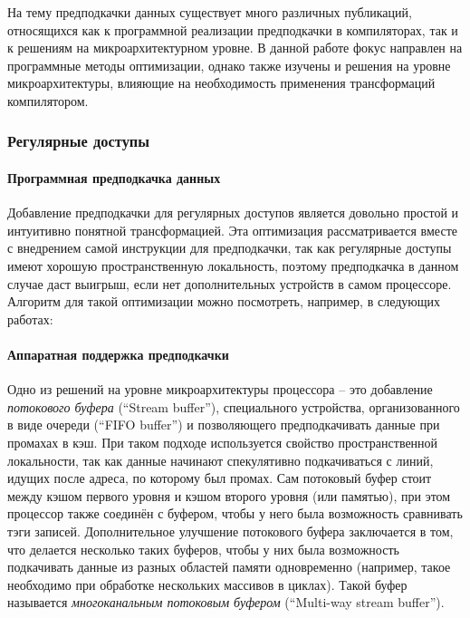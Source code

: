 \documentclass[12pt,a4paper]{article}
\begin{document}
На тему предподкачки данных существует много различных публикаций, относящихся как к программной реализации предподкачки в компиляторах, так и к решениям на микроархитектурном уровне. В данной работе фокус направлен на программные методы оптимизации, однако также изучены и решения на уровне микроархитектуры, влияющие на необходимость применения трансформаций компилятором.

\subsubsection{Регулярные доступы}

\paragraph{Программная предподкачка данных}

Добавление предподкачки для регулярных доступов является довольно простой и интуитивно понятной трансформацией. Эта оптимизация рассматривается вместе с внедрением самой инструкции для предподкачки, так как регулярные доступы имеют хорошую пространственную локальность, поэтому предподкачка в данном случае даст выигрыш, если нет дополнительных устройств в самом процессоре. Алгоритм для такой оптимизации можно посмотреть, например, в следующих работах: %

\paragraph{Аппаратная поддержка предподкачки}

Одно из решений на уровне микроархитектуры процессора -- это добавление \emph{потокового буфера} (``Stream buffer''), специального устройства, организованного в виде очереди (``FIFO buffer'') и позволяющего предподкачивать данные при промахах в кэш. При таком подходе используется свойство пространственной локальности, так как данные начинают спекулятивно подкачиваться с линий, идущих после адреса, по которому был промах. Сам потоковый буфер стоит между кэшом первого уровня и кэшом второго уровня (или памятью), при этом процессор также соединён с буфером, чтобы у него была возможность сравнивать тэги записей. Дополнительное улучшение потокового буфера заключается в том, что делается несколько таких буферов, чтобы у них была возможность подкачивать данные из разных областей памяти одновременно (например, такое необходимо при обработке нескольких массивов в циклах). Такой буфер называется \emph{многоканальным потоковым буфером} (``Multi-way stream buffer'').
\end{document}
